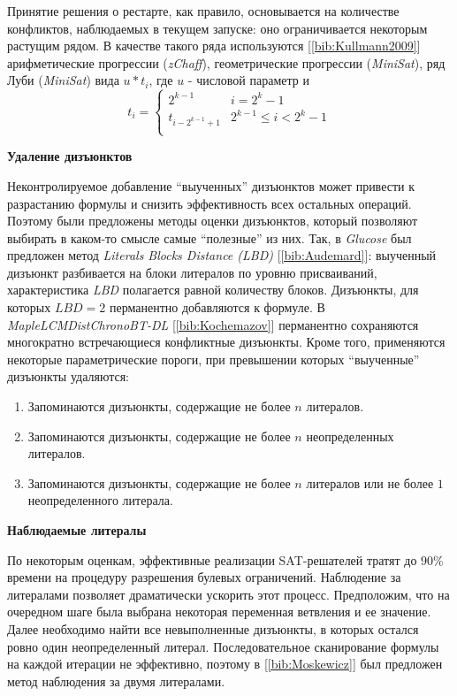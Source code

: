 Принятие решения о рестарте, как правило, основывается на количестве конфликтов, наблюдаемых в текущем запуске: 
оно ограничивается некоторым растущим рядом. В качестве такого ряда используются [\ref{bib:Kullmann2009}] арифметические прогрессии (\textit{zChaff}), геометрические прогрессии (\textit{MiniSat}), ряд Луби (\textit{MiniSat}) вида $u * t_i$, где $u$ - числовой параметр и 
\begin{equation*}
t_i = 
\begin{cases}
2^{k-1} & i = 2^k - 1 \\
t_{i - 2^{k-1} + 1} & 2^{k-1} \leq i < 2^k - 1 \\
\end{cases}
\end{equation*}

\textbf{Удаление дизъюнктов}

Неконтролируемое добавление \enquote{выученных} дизъюнктов может привести к разрастанию формулы и снизить эффективность всех остальных операций. Поэтому были предложены методы оценки дизъюнктов, который позволяют выбирать в каком-то смысле самые \enquote{полезные} из них. 
Так, в \textit{Glucose} был предложен метод \textit{Literals Blocks Distance (LBD)} [\ref{bib:Audemard}]: 
выученный дизъюнкт разбивается на блоки литералов по уровню присваиваний, 
характеристика \textit{LBD} полагается равной количеству блоков. Дизъюнкты, для которых $LBD=2$ перманентно добавляются к формуле. 
В \textit{MapleLCMDistChronoBT-DL} [\ref{bib:Kochemazov}] перманентно сохраняются многократно встречающиеся конфликтные дизъюнкты.  
Кроме того, применяются некоторые параметрические пороги, при превышении которых \enquote{выученные} дизъюнкты удаляются:

\begin{enumerate}

\item Запоминаются дизъюнкты, содержащие не более $n$ литералов.

\item Запоминаются дизъюнкты, содержащие не более $n$ неопределенных литералов.

\item Запоминаются дизъюнкты, содержащие не более $n$ литералов или не более $1$ неопределенного литерала.

\end{enumerate}

\textbf{Наблюдаемые литералы}

По некоторым оценкам, эффективные реализации SAT-решателей тратят до $90\%$ времени на процедуру разрешения булевых ограничений. Наблюдение за литералами позволяет драматически ускорить этот процесс. Предположим, что на очередном шаге была выбрана некоторая переменная ветвления и ее значение. Далее необходимо найти все невыполненные дизъюнкты, в которых остался ровно один неопределенный литерал. Последовательное сканирование формулы на каждой итерации не эффективно, поэтому в [\ref{bib:Moskewicz}] был предложен метод наблюдения за двумя литералами.

